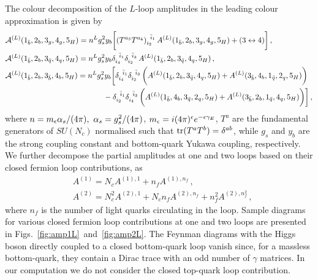 \documentclass[main.tex]{subfiles}
\begin{document}
The colour decomposition of the $L$-loop amplitudes in the leading colour approximation is given by
\begin{align}
&\mathcal{A}^{(L)}(1_{\bar b},2_{b},3_{g},4_{g} ,5_{H}) = n^L g_s^2 y_b \bigg[ 
  (T^{a_3} T^{a_4})_{i_2}^{\;\;\bar i_1} \,  A^{(L)}(1_{\bar b},2_{b},3_{g},4_{g} ,5_{H}) + ( 3 \leftrightarrow 4 ) \bigg]\,, \nonumber\\
&\mathcal{A}^{(L)}(1_{\bar b},2_{b},3_{\bar{q}},4_{q} ,5_{H}) = n^L  g_s^2 y_b 
 \delta_{i_4}^{\;\;\bar i_1} \delta_{i_2}^{\;\;\bar i_3}  \,
  A^{(L)}(1_{\bar b},2_{b},3_{\bar{q}},4_{q} ,5_{H}) \,,  \label{eq:colourdecomposition} \\
&\mathcal{A}^{(L)}(1_{\bar b},2_{b},3_{\bar{b}},4_{b} ,5_{H}) = n^L  g_s^2 y_b \bigg[
  \delta_{i_4}^{\;\;\bar i_1} \delta_{i_2}^{\;\;\bar i_3}  \, \biggl( A^{(L)}(1_{\bar b},2_{b},3_{\bar{q}},4_{q} ,5_{H}) + A^{(L)}(3_{\bar b},4_{b},1_{\bar{q}},2_{q} ,5_{H}) \biggr) \,  \nonumber\\
& \hspace{4.5cm} -\delta_{i_2}^{\;\;\bar i_1} \delta_{i_4}^{\;\;\bar i_3}  \, \biggl( A^{(L)}(1_{\bar b},4_{b},3_{\bar{q}},2_{q} ,5_{H}) + A^{(L)}(3_{\bar b},2_{b},1_{\bar{q}},4_{q} ,5_{H}) \biggr) \bigg]\,, 
\nonumber 
\end{align}
where $n= m_\epsilon  \alpha_s/(4\pi),\ \alpha_s = g_s^2/(4\pi)$, $m_\epsilon=i (4\pi)^{\epsilon} e^{-\epsilon\gamma_E}$, $T^a$ 
are the fundamental generators of $SU(N_c)$ normalised such that $\operatorname{\rm tr}(T^a T^b) = \delta^{ab}$,
while $g_s$ and $y_b$ are the strong coupling constant and bottom-quark Yukawa coupling, respectively. 
We further decompose the partial amplitudes at one and two loops based on their closed fermion loop contributions, as
\begin{align}
& A^{(1)} = N_c A^{(1),1} + n_f A^{(1),n_f}  \,,  
\label{eq:NfDecomposition1L} \\
& A^{(2)} = N_c^2 A^{(2),1} + N_c n_f A^{(2),n_f} + n_f^2 A^{(2),n_f^2}  \,, 
\label{eq:NfDecomposition2L}
\end{align}
where $n_f$ is the number of light quarks circulating in the loop.
Sample diagrams for various closed fermion loop contributions at one and two loops are presented in Figs.~\ref{fig:amp1L}~and~\ref{fig:amp2L}.
The Feynman diagrams with the Higgs boson directly coupled to a closed bottom-quark loop vanish since, for a massless bottom-quark, they contain a Dirac trace with an odd number of $\gamma$ matrices. 
In our computation we do not consider the closed top-quark loop contribution. 
\end{document}
